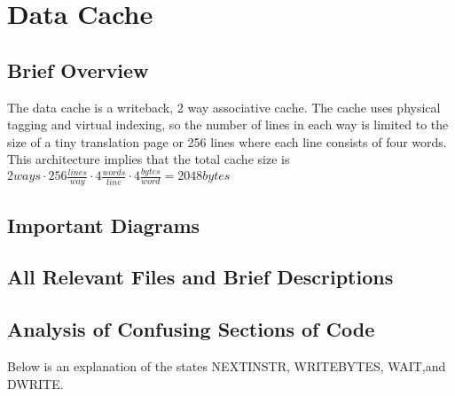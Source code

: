 \section{Data Cache}

\subsection{Brief Overview}

The data cache is a writeback, 2 way associative cache. The cache uses physical tagging and virtual indexing, so the number of lines in each way is limited to the size of a tiny translation page or 256 lines where each line consists of four words. This architecture implies that the total cache size is $2 ways \cdot 256 \frac{lines}{way} \cdot 4 \frac{words}{line} \cdot 4 \frac{bytes}{word} = 2048 bytes$

\subsection{Important Diagrams}


\subsection{All Relevant Files and Brief Descriptions}


\subsection{Analysis of Confusing Sections of Code}

Below is an explanation of the states NEXTINSTR, WRITEBYTES, WAIT,and DWRITE.

